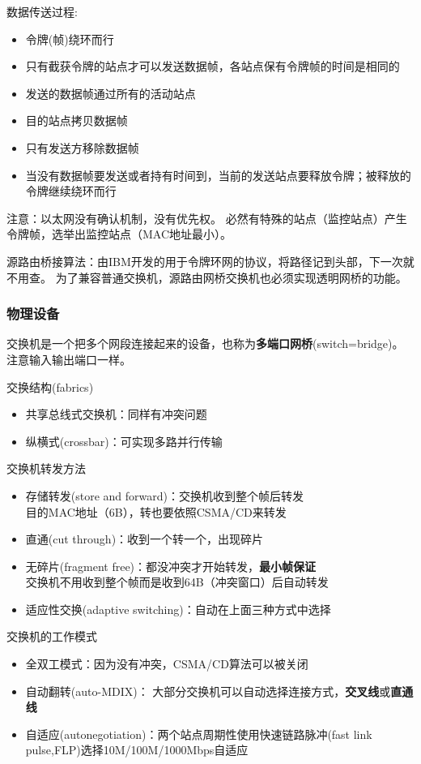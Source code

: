 数据传送过程:
\begin{itemize}
	\item 令牌(帧)绕环而行
	\item 只有截获令牌的站点才可以发送数据帧，各站点保有令牌帧的时间是相同的
	\item 发送的数据帧通过所有的活动站点
	\item 目的站点拷贝数据帧
	\item 只有发送方移除数据帧
	\item 当没有数据帧要发送或者持有时间到，当前的发送站点要释放令牌；被释放的令牌继续绕环而行
\end{itemize}

注意：以太网没有确认机制，没有优先权。
必然有特殊的站点（监控站点）产生令牌帧，选举出监控站点（MAC地址最小）。

源路由桥接算法：由IBM开发的用于令牌环网的协议，将路径记到头部，下一次就不用查。
为了兼容普通交换机，源路由网桥交换机也必须实现透明网桥的功能。

\subsubsection{物理设备}
\label{subsub:physical_equipment}
交换机是一个把多个网段连接起来的设备，也称为\textbf{多端口网桥}(switch=bridge)。
注意输入输出端口一样。

交换结构(fabrics)
\begin{itemize}
	\item 共享总线式交换机：同样有冲突问题
	\item 纵横式(crossbar)：可实现多路并行传输
\end{itemize}

交换机转发方法
\begin{itemize}
\item 存储转发(store and forward)：交换机收到整个帧后转发\\
目的MAC地址（6B），转也要依照CSMA/CD来转发
\item 直通(cut through)：收到一个转一个，出现碎片
\item 无碎片(fragment free)：都没冲突才开始转发，\textbf{最小帧保证}\\
交换机不用收到整个帧而是收到64B（冲突窗口）后自动转发
\item 适应性交换(adaptive switching)：自动在上面三种方式中选择
\end{itemize}

交换机的工作模式
\begin{itemize}
\item 全双工模式：因为没有冲突，CSMA/CD算法可以被关闭
\item 自动翻转(auto-MDIX)：
大部分交换机可以自动选择连接方式，\textbf{交叉线}或\textbf{直通线}
\item 自适应(autonegotiation)：两个站点周期性使用快速链路脉冲(fast link pulse,FLP)选择10M/100M/1000Mbps自适应
\end{itemize}


